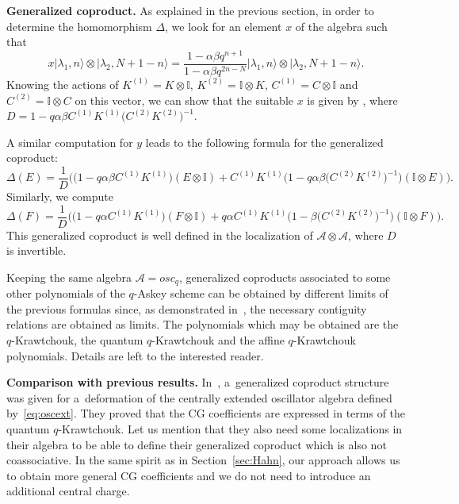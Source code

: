 \documentclass[10pt,a4paper]{amsart}
\numberwithin{equation}{section}
\theoremstyle{definition}
\begin{document}
{\bf Generalized coproduct.} As explained in the previous section, in order to determine the homomorphism $\Delta$, we look for an element $x$ of the algebra such that
\[
 x|\lambda_1,n\rangle\otimes |\lambda_2,N+1-n\rangle=\frac{1-\alpha\beta q^{n+1}}{1-\alpha\beta q^{2n-N}}|\lambda_1,n\rangle\otimes |\lambda_2,N+1-n\rangle.
\]
Knowing the actions of $K^{(1)}=K\otimes \mathbb{I}$, $K^{(2)}=\mathbb{I} \otimes K$, $C^{(1)}=C\otimes \mathbb{I}$ and $C^{(2)}=\mathbb{I} \otimes C$ on this vector, we can show that the suitable $x$ is given by
,
where $D=1-q\alpha\beta C^{(1)}K^{(1)}\bigl(C^{(2)}K^{(2)}\bigr)^{-1}$.

A similar computation for $y$ leads to the following formula for the generalized coproduct:
\[
 \Delta(E)=\frac{1}{D}\bigl(\bigl(1-q\alpha\beta C^{(1)}K^{(1)}\bigr)(E\otimes \mathbb{I})+C^{(1)}K^{(1)}\bigl(1-q\alpha\beta \bigl(C^{(2)}K^{(2)}\bigr)^{-1}\bigr)(\mathbb{I}\otimes E)\bigr).
\]
Similarly, we compute
\[
\Delta(F)=\frac{1}{D}\bigl(\bigl(1-q\alpha C^{(1)}K^{(1)}\bigr)(F\otimes \mathbb{I})+q\alpha C^{(1)}K^{(1)} \bigl(1-\beta \bigl(C^{(2)}K^{(2)}\bigr)^{-1}\bigr)(\mathbb{I}\otimes F)\bigr).\]
This generalized coproduct is well defined in the localization of $\mathcal{A}\otimes \mathcal{A}$, where $D$
is invertible.



Keeping the same algebra $\mathcal{A}=osc_q$, generalized coproducts associated to some other polynomials of the $q$-Askey scheme can be obtained by different limits of the previous formulas since, as demonstrated in~\cite{contiguity}, the necessary contiguity relations are obtained as limits. The polynomials which may be obtained are the $q$-Krawtchouk, the quantum $q$-Krawtchouk and the affine $q$-Krawtchouk polynomials. Details are left to the interested reader.

{\bf Comparison with previous results.} In~\cite{KMM92}, a~generalized coproduct structure was given for a~deformation of the centrally extended oscillator algebra defined by~\eqref{eq:oscext}. They proved that the CG coefficients are expressed in terms of the quantum $q$-Krawtchouk. Let us mention that they also need some localizations in their algebra to be able to define their generalized coproduct which is also not coassociative. In the same spirit as in Section~\ref{sec:Hahn}, our approach allows us to obtain more general CG coefficients and we do not need to introduce an additional central charge.
\end{document}

